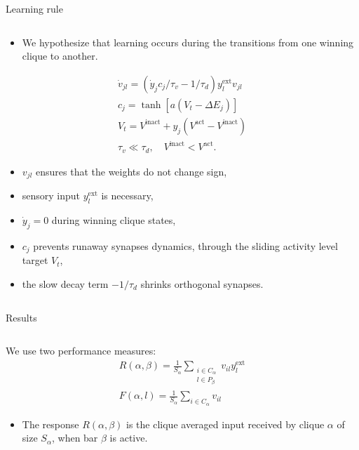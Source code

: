 \documentclass[final,hyperref={pdfpagelabels=false}]{beamer}
\begin{document}
\begin{frame}
\begin{columns}
\begin{column}{.60\textwidth}
\begin{minipage}[T]{.95\textwidth}
{\begin{minipage}[T]{.55\textwidth}
\begin{block}{Learning rule}
\begin{columns}
\begin{column}[T]{1\textwidth}
\begin{itemize}
							\item We hypothesize that learning occurs during the transitions from one winning clique to another.
						\end{itemize}
						\begin{gather*}
						\dot{v}_{jl} = \left(\dot{y}_j c_j / \tau_v  - 1 / \tau_d\right) y_l^{\text{ext}} v_{jl}  \\
						c_j = \tanh{\left[a \left(V_t - \Delta E_j \right)\right]} \\
						V_t = V^{\text{inact}} + y_j \left(V^{\text{act}} - V^{\text{inact}}\right)\\
						\tau_v \ll \tau_d, \quad V^{\text{inact}} < V^{\text{act}}.	
						\end{gather*}
						\begin{itemize}
							\item $v_{jl}$ ensures that the weights do not change sign,
							\item sensory input $y_l^{\text{ext}}$ is necessary,
							\item $\dot{y}_j = 0$ during winning clique states,
							\item $c_j$ prevents runaway synapses dynamics, through the sliding activity level target $V_t$,
							\item the slow decay term $-1/\tau_d$ shrinks orthogonal synapses.
						\end{itemize}
					\end{column}
			
				\end{columns}
			\end{block}
		\vfill
			\begin{block}{Results}
				\begin{columns}									
					\begin{column}[T]{1\textwidth}
						We use two performance measures:
						\begin{gather*}
						R(\alpha, \beta) = \frac{1}{S_\alpha} \sum_{\substack{i\in C_\alpha \\ l \in P_\beta}} v_{il} y_l^{\text{ext}} \\
						F(\alpha, l) = \frac{1}{S_\alpha} \sum_{i\in C_\alpha} v_{il}
						\end{gather*}
						\begin{itemize}
							\item The response $R(\alpha, \beta)$ is the clique averaged input received by clique $\alpha$ of size $S_\alpha$, when bar $\beta$ is active.
							

\end{itemize}
\end{column}
\end{columns}
\end{block}
\end{minipage}}
\end{minipage}
\end{column}
\end{columns}
\end{frame}
\end{document}
